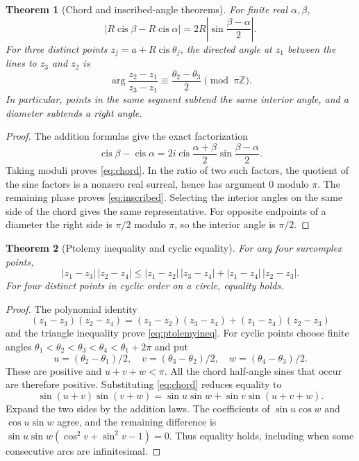 \documentclass[11pt,letterpaper]{article}
\newtheorem{theorem}{Theorem}[section]
\theoremstyle{definition}
\theoremstyle{remark}
\newcommand{\Z}{\mathbb Z}\newcommand{\N}{\mathbb N}
\newcommand{\cis}{\operatorname{cis}}
\numberwithin{equation}{section}
\begin{document}
\begin{theorem}[Chord and inscribed-angle theorems]\label{thm:chords}
For finite real $\alpha,\beta$,
\begin{equation}\label{eq:chord}
 |R\cis\beta-R\cis\alpha|
 =2R\left|\sin\frac{\beta-\alpha}{2}\right|.
\end{equation}
For three distinct points $z_j=a+R\cis\theta_j$, the directed angle at $z_1$ between the lines to $z_3$ and $z_2$ is
\begin{equation}\label{eq:inscribed}
 \arg\frac{z_2-z_1}{z_3-z_1}
 \equiv\frac{\theta_2-\theta_3}{2}\pmod{\pi\Z}.
\end{equation}
In particular, points in the same segment subtend the same interior angle, and a diameter subtends a right angle.
\end{theorem}
\begin{proof}
The addition formulas give the exact factorization
\begin{equation}\label{eq:chordfactor}
 \cis\beta-\cis\alpha
 =2i\cis\frac{\alpha+\beta}{2}\sin\frac{\beta-\alpha}{2}.
\end{equation}
Taking moduli proves \eqref{eq:chord}. In the ratio of two such factors, the quotient of the sine factors is a nonzero real surreal, hence has argument $0$ modulo $\pi$. The remaining phase proves \eqref{eq:inscribed}. Selecting the interior angles on the same side of the chord gives the same representative. For opposite endpoints of a diameter the right side is $\pi/2$ modulo $\pi$, so the interior angle is $\pi/2$.
\end{proof}

\begin{theorem}[Ptolemy inequality and cyclic equality]\label{thm:ptolemy}
For any four surcomplex points,
\begin{equation}\label{eq:ptolemyineq}
 |z_1-z_3|\,|z_2-z_4|
 \le |z_1-z_2|\,|z_3-z_4|+|z_1-z_4|\,|z_2-z_3|.
\end{equation}
For four distinct points in cyclic order on a circle, equality holds.
\end{theorem}
\begin{proof}
The polynomial identity
\[
 (z_1-z_3)(z_2-z_4)
 =(z_1-z_2)(z_3-z_4)+(z_1-z_4)(z_2-z_3)
\]
and the triangle inequality prove \eqref{eq:ptolemyineq}. For cyclic points choose finite angles
$\theta_1<\theta_2<\theta_3<\theta_4<\theta_1+2\pi$ and put
\[
 u=(\theta_2-\theta_1)/2,\quad
 v=(\theta_3-\theta_2)/2,\quad
 w=(\theta_4-\theta_3)/2.
\]
These are positive and $u+v+w<\pi$. All the chord half-angle sines that occur are therefore positive. Substituting \eqref{eq:chord} reduces equality to
\[
 \sin(u+v)\sin(v+w)
 =\sin u\sin w+\sin v\sin(u+v+w).
\]
Expand the two sides by the addition laws. The coefficients of $\sin u\cos w$ and $\cos u\sin w$ agree, and the remaining difference is
$\sin u\sin w(\cos^2v+\sin^2v-1)=0$. Thus equality holds, including when some consecutive arcs are infinitesimal.
\end{proof}
\end{document}
